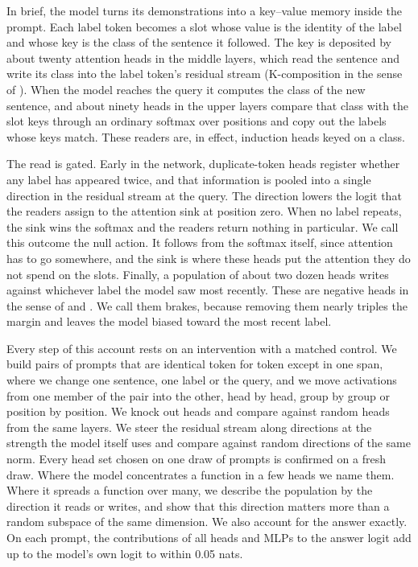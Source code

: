 \documentclass{article}
\begin{document}
In brief, the model turns its demonstrations into a key--value memory inside the prompt. Each label token becomes a slot whose value is the identity of the label and whose key is the class of the sentence it followed. The key is deposited by about twenty attention heads in the middle layers, which read the sentence and write its class into the label token's residual stream (K-composition in the sense of \citealt{elhage2021framework}). When the model reaches the query it computes the class of the new sentence, and about ninety heads in the upper layers compare that class with the slot keys through an ordinary softmax over positions and copy out the labels whose keys match. These readers are, in effect, induction heads keyed on a class.

The read is gated. Early in the network, duplicate-token heads register whether any label has appeared twice, and that information is pooled into a single direction in the residual stream at the query. The direction lowers the logit that the readers assign to the attention sink at position zero. When no label repeats, the sink wins the softmax and the readers return nothing in particular. We call this outcome the null action. It follows from the softmax itself, since attention has to go somewhere, and the sink is where these heads put the attention they do not spend on the slots. Finally, a population of about two dozen heads writes against whichever label the model saw most recently. These are negative heads in the sense of \citet{wang2022ioi} and \citet{mcdougall2023copysuppression}. We call them brakes, because removing them nearly triples the margin and leaves the model biased toward the most recent label.

Every step of this account rests on an intervention with a matched control. We build pairs of prompts that are identical token for token except in one span, where we change one sentence, one label or the query, and we move activations from one member of the pair into the other, head by head, group by group or position by position. We knock out heads and compare against random heads from the same layers. We steer the residual stream along directions at the strength the model itself uses and compare against random directions of the same norm. Every head set chosen on one draw of prompts is confirmed on a fresh draw. Where the model concentrates a function in a few heads we name them. Where it spreads a function over many, we describe the population by the direction it reads or writes, and show that this direction matters more than a random subspace of the same dimension. We also account for the answer exactly. On each prompt, the contributions of all heads and MLPs to the answer logit add up to the model's own logit to within 0.05 nats.
\end{document}
